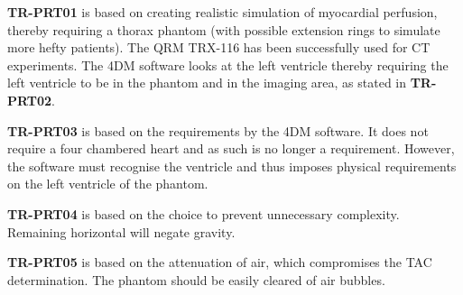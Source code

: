 \textbf{TR-PRT01} is based on creating realistic simulation of myocardial perfusion, thereby requiring a thorax phantom (with possible extension rings to simulate more hefty patients). The QRM TRX-116 has been successfully used for CT experiments. The 4DM software looks at the left ventricle thereby requiring the left ventricle to be in the phantom and in the imaging area, as stated in \textbf{TR-PRT02}.

\textbf{TR-PRT03} is based on the requirements by the 4DM software. It does not require a four chambered heart and as such is no longer a requirement. However, the software must recognise the ventricle and thus imposes physical requirements on the left ventricle of the phantom.

\textbf{TR-PRT04} is based on the choice to prevent unnecessary complexity. Remaining horizontal will negate gravity.

\textbf{TR-PRT05} is based on the attenuation of air, which compromises the TAC determination. The phantom should be easily cleared of air bubbles.

